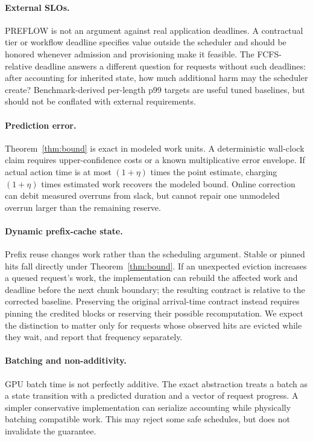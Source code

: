 \documentclass{article}
\newcommand{\preflow}{\textnormal{\textsc{PREFLOW}}}
\begin{document}
\paragraph{External SLOs.}
\preflow{} is not an argument against real application deadlines.  A
contractual tier or workflow deadline specifies value outside the scheduler and
should be honored whenever admission and provisioning make it feasible.  The
FCFS-relative deadline answers a different question for requests without such
deadlines: after accounting for inherited state, how much additional harm may
the scheduler create?  Benchmark-derived per-length p99 targets are useful
tuned baselines, but should not be conflated with external requirements.

\paragraph{Prediction error.}
Theorem~\ref{thm:bound} is exact in modeled work units.  A deterministic
wall-clock claim requires upper-confidence costs or a known multiplicative
error envelope.  If actual action time is at most $(1+\eta)$ times the point
estimate, charging $(1+\eta)$ times estimated work recovers the modeled bound.
Online correction can debit measured overruns from slack, but cannot repair one
unmodeled overrun larger than the remaining reserve.

\paragraph{Dynamic prefix-cache state.}
Prefix reuse changes work rather than the scheduling argument.  Stable or
pinned hits fall directly under Theorem~\ref{thm:bound}.  If an unexpected
eviction increases a queued request's work, the implementation can rebuild the
affected work and deadline before the next chunk boundary; the resulting
contract is relative to the corrected baseline.  Preserving the original
arrival-time contract instead requires pinning the credited blocks or reserving
their possible recomputation.  We expect the distinction to matter only for
requests whose observed hits are evicted while they wait, and report that
frequency separately.

\paragraph{Batching and non-additivity.}
GPU batch time is not perfectly additive.  The exact abstraction treats a
batch as a state transition with a predicted duration and a vector of request
progress.  A simpler conservative implementation can serialize accounting
while physically batching compatible work.  This may reject some safe
schedules, but does not invalidate the guarantee.
\end{document}
